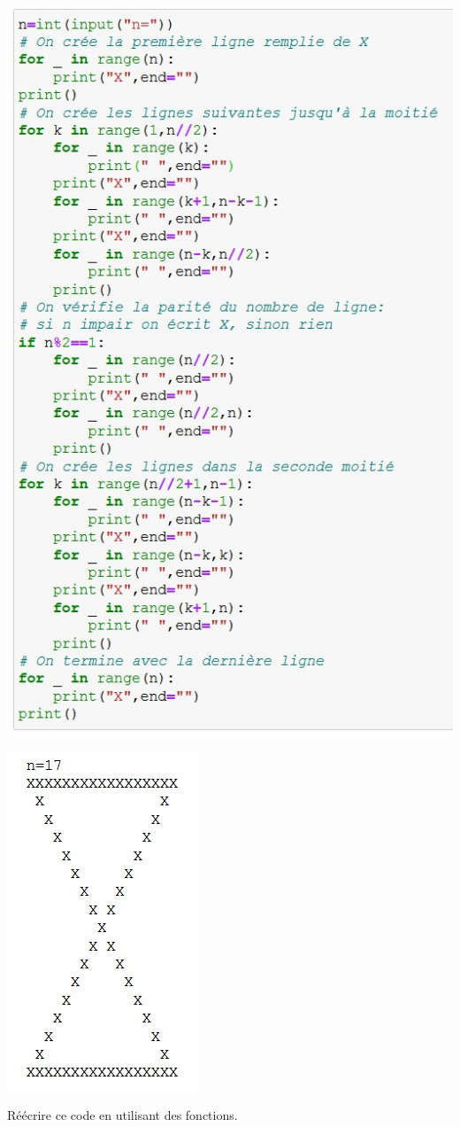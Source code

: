 \documentclass[11pt,a4paper]{article}
\begin{document}
\begin{center}
\begin{minipage}{11cm}
\includegraphics[scale=0.8]{img/bouclescarreXcroix.jpg}
\end{minipage}
\begin{minipage}{5cm}
\includegraphics[scale=0.8]{img/carreXcroix.jpg}
\end{minipage}
\end{center}

Réécrire ce code en utilisant des fonctions.
\end{document}
